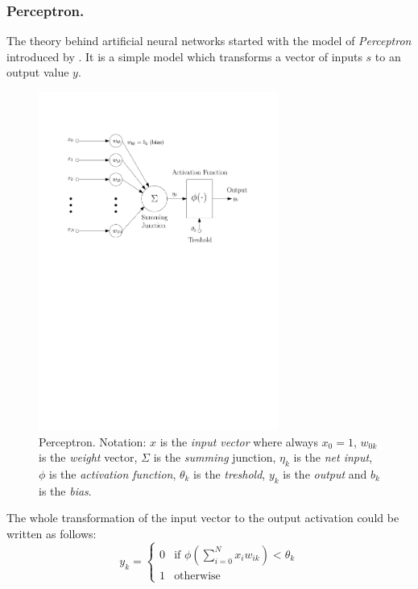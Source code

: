 \subsubsection{Perceptron.}

The theory behind artificial neural networks started with the model of \emph{Perceptron} introduced by \citet{mcculloch1943logical}. It is a simple model which transforms a vector of inputs $s$ to an output value $y$. 

\begin{figure}[h]
  \centering
  \includegraphics[width=0.7\textwidth]{img/perceptron.pdf}    
  \caption{Perceptron. Notation: $x$ is the \emph{input vector} where always $x_0=1$, $w_{0k}$ is the \emph{weight} vector, $\Sigma$ is the \emph{summing} junction, $\eta_k$ is the \emph{net input}, $\phi$ is the \emph{activation function}, $\theta_k$ is the \emph{treshold}, $y_k$ is the \emph{output} and $b_k$ is the \emph{bias}.} 
  \label{fig:perceptron}
\end{figure}

The whole transformation of the input vector to the output activation could be written as follows: 
\begin{equation}
\label{eq:perceptron} 
y_k =
\left\{
	\begin{array}{ll}
		0 & \mbox{if } \phi(\sum_{i=0}^N x_iw_{ik}) < \theta_k \\
		1 & \mbox{otherwise}
	\end{array}
\right.
\end{equation} 

